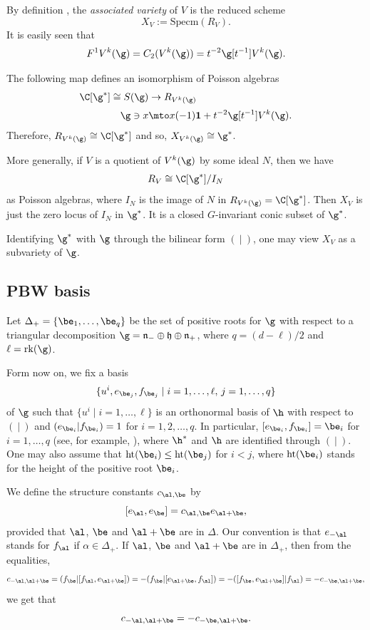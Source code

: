 By definition \cite{Ara12}, the
\emph{associated variety} of $V$
is
the reduced scheme
\[
X_V:= \mathrm{Specm}(R_V).
\]
It is easily seen that
\[
F^1 V^k(\g) = C_2(V^k(\g)) = t^{-2} \g[t^{-1}] V^k(\g).
\]

The following map defines an isomorphism of Poisson algebras
\begin{align*}
\C[\g^*] \cong S(\g) & \to R_{V^k(\g)} \\[0.2em]
\g \ni x & \mto x (-1) \mathbf{1}
+ t^{-2} \g[t^{-1}] V^k(\g).
\end{align*}
Therefore, $R_{V^k(\g)} \cong \C[\g^*]$ and so, $
X_{V^k(\g)}\cong \g^*$.

More generally, if $V$ is a quotient of $V^k(\g)$
by some ideal $N$, then
we have
\begin{equation}
R_{V}\cong \C[\g^*]/I_N
\end{equation}
as Poisson algebras,
where $I_N$ is the image of $N$ in $R_{V^k(\g)}=\C[\g^*]$.
Then $X_V$ is just the zero locus of $I_N$ in
$\g^*$.
It is a closed $G$-invariant conic subset of $\g^*$.

Identifying $\g^*$ with $\g$ through the bilinear form $(~|~)$,
one may view $X_V$ as a subvariety of $\g$.

\subsection{PBW basis}
Let ${\Delta}_{+}=\{\be_1,\dots,\be_q\}$ be the set of positive roots for $\g$ with respect
to a triangular decomposition
$\g= \mathfrak{n}_- \oplus \mathfrak{h} \oplus \mathfrak{n}_+$,
where $q=(d-\ell)/2$ and $\ell=\mathrm{rk}(\g)$.

Form now on, we
fix a basis
\[
\{u^i, e_{\be_j}, f_{\be_j}\mid i=1,\dots,\ell, \, j=1,\dots, q\}
\]
of $\g$ such that $\{u^{i} \mid i=1,\dots,\ell\}$
is an orthonormal basis of $\h$ with respect to $(~|~)$ and
$(e_{\be_i}|f_{\be_i})=1$ for $i=1,2,\dots,q$.
In particular, $[e_{\be_i}, f_{\be_i}]= \be_i$
for $i=1,\dots,q$ (see, for example, \cite[Prop.\,8.3]{Hu72}),
where $\h^*$ and $\h$ are identified through $(~|~)$.
One may also assume that $\mathrm{ht}(\be_i)\leq \mathrm{ht}(\be_j)$ for $i< j$,
where $\mathrm{ht}(\be_i)$ stands for the height of the positive root $\be_i$.

We define the structure constants $c_{\al,\be}$ by
\[
[e_\al,e_{\be}] = c_{\al,\be} e_{\al+\be},
\]
provided that $\al$, $\be$ and $\al+\be$ are in $\Delta$.
Our convention is that $e_{-\al}$ stands for $f_\al$ if $\alpha \in \Delta_+$.
If $\al$, $\be$ and $\al+\be$ are in $\Delta_+$,
then from the equalities,
\begin{equation*}
c_{-\al,\al+\be} = (f_{\be} | [f_{\al},e_{\al+\be}]) = - (f_{\be} | [e_{\al+\be},f_{\al}])
= - ([f_{\be}, e_{\al+\be}]|f_{\al}) = - c_{-\be,\al+\be},
\end{equation*}
we get that
\begin{equation}
\label{eq:structure_constant}
c_{-\al,\al+\be}= - c_{-\be,\al+\be}.
\end{equation}

